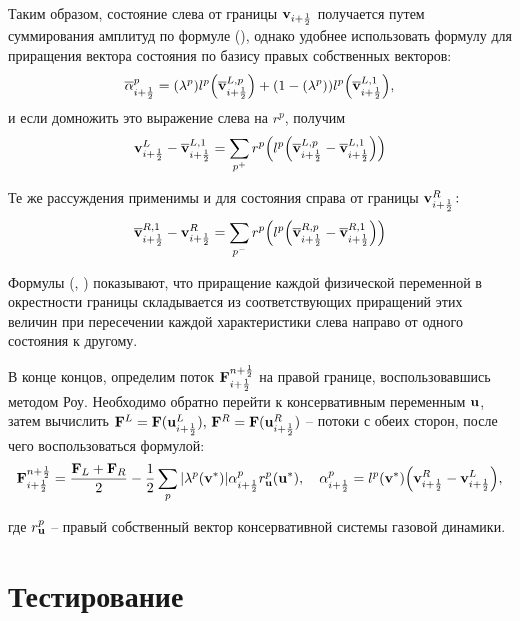 \documentclass[12pt,a4paper]{article}
\newcommand{\half}{\frac{1}{2}}
\newcommand{\dhalf}{\dfrac{1}{2}}
\begin{document}
    Таким образом, состояние слева от границы $ \bold v_{i + \half} $ получается путем суммирования амплитуд по формуле (), однако удобнее использовать формулу для приращения вектора состояния по базису правых собственных векторов:
    \[
        \overline{\alpha}^p_{i + \half} = \Theta (\lambda^p) l^p \Bigl(\overline{\bold v}_{i + \half}^{L, p}\Bigr) + (1 - \Theta(\lambda^p))l^p \Bigl(\overline{\bold v}_{i + \half}^{L, 1}\Bigr),
    \]
    и если домножить это выражение слева на $r^p$, получим
    \begin{equation}
        \label{value:l}
        \bold v^L_{i + \half} - \overline{\bold v}_{i + \half}^{L, 1} = \sum_{p^+} r^p \Bigl( l^p \Bigl( \overline{\bold v}_{i + \half}^{L, p} - \overline{\bold v}_{i + \half}^{L, 1} \Bigr) \Bigr)
    \end{equation}
        
    Те же рассуждения применимы и для состояния справа от границы $\bold v^R_{i + \half} \colon$
    \begin{equation}
        \label{value:r}
        \overline{\bold v}_{i + \half}^{R, 1} - \bold v^R_{i + \half} = \sum_{p^-} r^p \Bigl( l^p \Bigl( \overline{\bold v}_{i + \half}^{R, p} - \overline{\bold v}_{i + \half}^{R, 1} \Bigr) \Bigr)
    \end{equation}

    Формулы (, ) показывают, что приращение каждой физической переменной в окрестности границы складывается из соответствующих приращений этих величин при пересечении каждой характеристики слева направо от одного состояния к другому.

    В конце концов, определим поток $\bold F^{n + \half}_{i + \half}$ на правой границе, воспользовавшись методом Роу. Необходимо обратно перейти к консервативным переменным $\bold u$, затем вычислить $\bold F^L =\bold F(\bold u^L_{i + \half}),\, \bold F^R = \bold F(\bold u^R_{i + \half})$ -- потоки с обеих сторон, после чего воспользоваться формулой:
    \[
        \bold F^{n + \half}_{i + \half} = \dfrac{\bold F_L + \bold F_R}{2} - \dhalf \sum_p |\lambda^p (\bold v^*)| \Delta \alpha^p_{i + \half} r_{\bold u}^p (\bold u^*), \quad \Delta \alpha^p_{i + \half} = l^p (\bold v^*) \Bigl( \bold v^R_{i + \half} - \bold v^L_{i + \half} \Bigr),
    \]

    \pagebreak 

    \noindent где $r_{\bold u}^p$ -- правый собственный вектор консервативной системы газовой динамики.

    \section{Тестирование}
\end{document}
